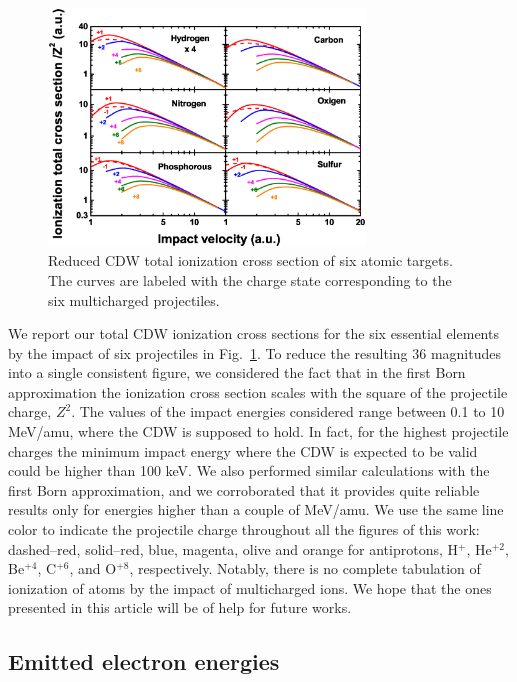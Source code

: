 \documentclass[preprint]{revtex4-2}
\begin{document}
\begin{figure}[t!]
\centering
\includegraphics[width=0.75\textwidth]{figuras/Fig_finales/Fig1.eps}
\caption{Reduced CDW total ionization cross section of six atomic 
targets. The curves are labeled with the charge state corresponding to 
the six multicharged projectiles.}
\label{fig:atomscaling}
\end{figure} 

We report our total CDW ionization cross sections for the six essential 
elements by the impact of six projectiles in Fig.~\ref{fig:atomscaling}.
To reduce the resulting 36 magnitudes into a single consistent 
figure, we considered the fact that in the first Born approximation
the ionization cross section scales with the square of the projectile 
charge, $Z^{2}$. The values of the impact energies considered 
range between 0.1 to 10 MeV/amu, where the CDW is supposed 
to hold. In fact, for the highest projectile charges the minimum 
impact energy where the CDW is expected to be valid could be 
higher than 100 keV. We also performed similar calculations with the 
first Born approximation, and we corroborated that it provides quite 
reliable results only for energies higher than a couple of MeV/amu. 
We use the same line color to indicate the projectile charge throughout 
all the figures of this work: dashed--red, solid--red, blue, magenta, 
olive and orange for antiprotons, H$^{+}$, He$^{+2}$, Be$^{+4}$, 
C$^{+6}$, and O$^{+8}$, respectively. Notably, there is no complete 
tabulation of ionization of atoms by the impact of multicharged ions. 
We hope that the ones presented in this article will be of help for 
future works.


\subsection{Emitted electron energies}
\label{subsec:meanener}
\end{document}

